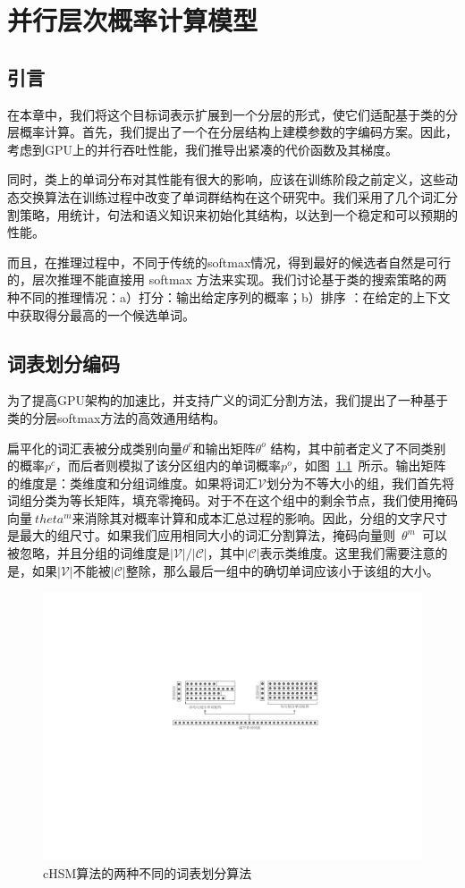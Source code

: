 \chapter{并行层次概率计算模型}
\section{引言}
在本章中，我们将这个目标词表示扩展到一个分层的形式，使它们适配基于类的分层概率计算。首先，我们提出了一个在分层结构上建模参数的字编码方案。因此，考虑到GPU上的并行吞吐性能，我们推导出紧凑的代价函数及其梯度。

同时，类上的单词分布对其性能有很大的影响，应该在训练阶段之前定义，这些动态交换算法在训练过程中改变了单词群结构在这个研究中。我们采用了几个词汇分割策略，用统计，句法和语义知识来初始化其结构，以达到一个稳定和可以预期的性能。

而且，在推理过程中，不同于传统的softmax情况，得到最好的候选者自然是可行的，层次推理不能直接用 softmax 方法来实现。我们讨论基于类的搜索策略的两种不同的推理情况：a）打分：输出给定序列的概率；b）排序   ：在给定的上下文中获取得分最高的一个候选单词。
\section{词表划分编码}
为了提高GPU架构的加速比，并支持广义的词汇分割方法，我们提出了一种基于类的分层softmax方法的高效通用结构。

扁平化的词汇表被分成类别向量$ \theta^c $和输出矩阵$ \theta^o $ 结构，其中前者定义了不同类别的概率$ p ^ c $，而后者则模拟了该分区组内的单词概率$ p ^ o $，如图~\ref {fig:chsm}~所示。输出矩阵的维度是：类维度和分组词维度。如果将词汇$ \mathcal {V} $划分为不等大小的组，我们首先将词组分类为等长矩阵，填充零掩码。对于不在这个组中的剩余节点，我们使用掩码向量$ \ theta ^ m $来消除其对概率计算和成本汇总过程的影响。因此，分组的文字尺寸是最大的组尺寸。如果我们应用相同大小的词汇分割算法，掩码向量则~$\theta^m$~可以被忽略，并且分组的词维度是$ \mathcal {| V | / | C |} $，其中$ \mathcal {| C |} $表示类维度。这里我们需要注意的是，如果$ \mathcal {| V |} $不能被$ \mathcal {| C |} $整除，那么最后一组中的确切单词应该小于该组的大小。
\begin{figure}[!ht]
  \centering
\includegraphics[width=0.85\linewidth]{./figures/chsm-simple.pdf}
\caption{cHSM算法的两种不同的词表划分算法}\label{fig:chsm}
\end{figure}


